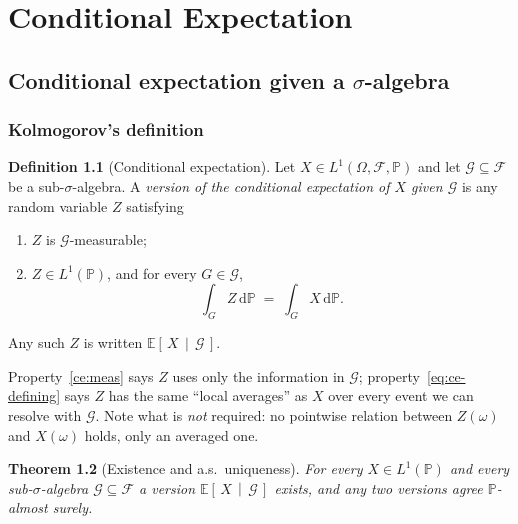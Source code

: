 \documentclass[11pt,oneside]{report}
\theoremstyle{plain}
\newtheorem{theorem}{Theorem}[chapter]
\theoremstyle{definition}
\newtheorem{definition}[theorem]{Definition}
\theoremstyle{remark}
\newcommand{\Prob}{\mathbb{P}}
\newcommand{\E}{\mathbb{E}}
\newcommand{\dd}{\,\mathrm{d}}
\newcommand{\Fcal}{\mathcal{F}}
\newcommand{\Gcal}{\mathcal{G}}
\newcommand{\cE}[2]{\E\!\left[\,#1 \,\middle|\, #2\,\right]}
\numberwithin{equation}{chapter}
\begin{document}
\part{Conditional Expectation}\label{part:cond-exp}

\chapter{Conditional expectation given a \texorpdfstring{$\sigma$}{sigma}-algebra}
\label{ch:cond-exp}

\section{Kolmogorov's definition}

\begin{definition}[Conditional expectation]\label{def:cond-exp}
Let $X\in L^1(\Omega,\Fcal,\Prob)$ and let $\Gcal\subseteq\Fcal$ be a
sub-$\sigma$-algebra. A \emph{version of the conditional expectation of
$X$ given $\Gcal$} is any random variable $Z$ satisfying
\begin{enumerate}[label=(CE\arabic*),leftmargin=3.2em]
\item $Z$ is $\Gcal$-measurable;\label{ce:meas}
\item $Z\in L^1(\Prob)$, and for every $G\in\Gcal$,
      \begin{equation}\label{eq:ce-defining}
        \int_G Z\dd\Prob \;=\; \int_G X\dd\Prob .
      \end{equation}
\end{enumerate}
Any such $Z$ is written $\cE{X}{\Gcal}$.
\end{definition}

Property~\ref{ce:meas} says $Z$ uses only the information in $\Gcal$;
property~\eqref{eq:ce-defining} says $Z$ has the same ``local averages'' as
$X$ over every event we can resolve with $\Gcal$. Note what is \emph{not}
required: no pointwise relation between $Z(\omega)$ and $X(\omega)$ holds,
only an averaged one.

\begin{theorem}[Existence and a.s.\ uniqueness]\label{thm:ce-exists}
For every $X\in L^1(\Prob)$ and every sub-$\sigma$-algebra
$\Gcal\subseteq\Fcal$ a version $\cE{X}{\Gcal}$ exists, and any two
versions agree $\Prob$-almost surely.
\end{theorem}
\end{document}
